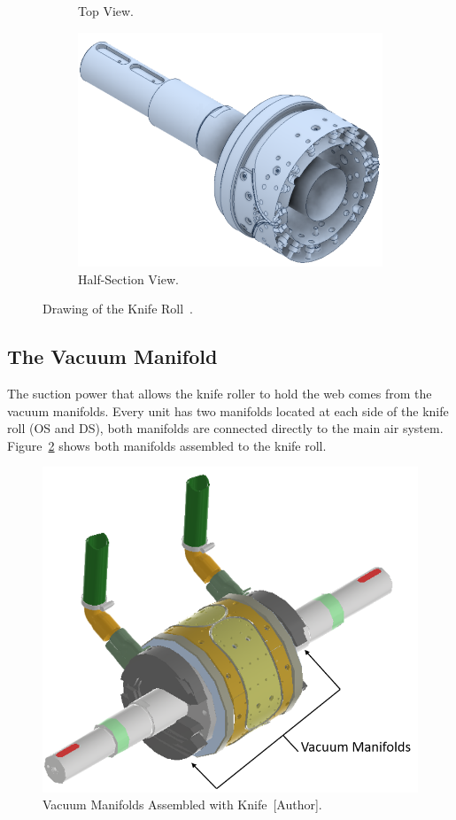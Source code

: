 \begin{figure}[H]
\begin{subfigure}{0.3\textwidth}
    \caption{Top View.}
  \end{subfigure}
  \begin{subfigure}{0.3\textwidth}
  \centering
    \includegraphics[width=1.1\linewidth]{FIGURES/knife3.png}
    \caption{Half-Section View.}
  \end{subfigure}
  \caption{Drawing of the Knife Roll~\cite{knife}.}
  \label{knife2}
\end{figure}
\subsection{The Vacuum Manifold}\label{sec2.1.2}

The suction power that allows the knife roller to hold the web comes from the vacuum manifolds. Every unit has two manifolds located at each side of the knife roll (OS and DS), both manifolds are connected directly to the main air system. Figure~\ref{knife&manifold} shows both manifolds assembled to the knife roll. 
\begin{figure}[H]
    \centering
    \includegraphics[width=0.65\linewidth]{FIGURES/manifold1.png}
    \caption{Vacuum Manifolds Assembled with Knife~[Author].}
    \label{knife&manifold}
\end{figure}

